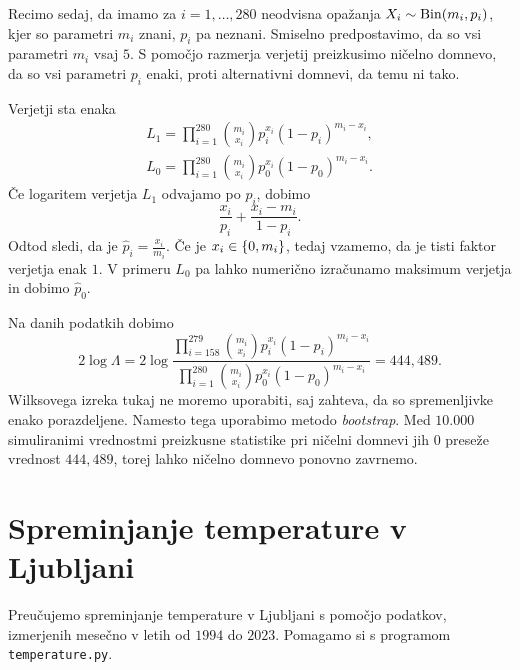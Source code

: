 \documentclass[12pt, a4paper]{article}
\begin{document}

Recimo sedaj, da imamo za $i = 1, \dots, 280$ neodvisna opažanja
$X_i \sim \operatorname{Bin}(m_i, p_i)$, kjer so parametri $m_i$ znani, 
$p_i$ pa neznani. Smiselno predpostavimo, da so vsi 
parametri $m_i$ vsaj $5$. S pomočjo razmerja verjetij preizkusimo 
ničelno domnevo, da so vsi parametri $p_i$ enaki, proti 
alternativni domnevi, da temu ni tako.

Verjetji sta enaka
\begin{align*}
    L_1 = \prod_{i=1}^{280} \binom{m_i}{x_i}p_i^{x_i}(1-p_i)^{m_i-x_i}, \\
    L_0 = \prod_{i=1}^{280} \binom{m_i}{x_i}p_0^{x_i}(1-p_0)^{m_i-x_i}.  
\end{align*}
Če logaritem verjetja $L_1$ odvajamo po $p_i$, dobimo
\[
    \frac{x_i}{p_i} + \frac{x_i-m_i}{1-p_i}.
\]
Odtod sledi, da je $\hat p_i = \frac{x_i}{m_i}$. Če je $x_i \in 
\left\{0, m_i\right\}$, tedaj vzamemo, da je tisti faktor verjetja enak $1$.
V primeru $L_0$ pa lahko numerično izračunamo maksimum verjetja in 
dobimo $\hat p_0$.

Na danih podatkih dobimo
\[
    2\log\Lambda = 2\log\frac{\prod_{i=158}^{279} \binom{m_i}{x_i}p_i^{x_i}(1-p_i)^{m_i-x_i}}
    {\prod_{i=1}^{280} \binom{m_i}{x_i}p_0^{x_i}(1-p_0)^{m_i-x_i}}
    = 444{,}489.
\]
Wilksovega izreka tukaj ne moremo uporabiti, saj zahteva, da 
so spremenljivke enako porazdeljene.
Namesto tega uporabimo metodo \textit{bootstrap}.
Med $10.000$ simuliranimi vrednostmi preizkusne statistike pri 
ničelni domnevi jih $0$ preseže vrednost $444{,}489$, torej 
lahko ničelno domnevo ponovno zavrnemo.

\newpage

\section{Spreminjanje temperature v Ljubljani}

Preučujemo spreminjanje temperature v Ljubljani s 
pomočjo podatkov, izmerjenih mesečno v letih od $1994$ do $2023$.
Pomagamo si s programom \texttt{temperature.py}.
\end{document}
